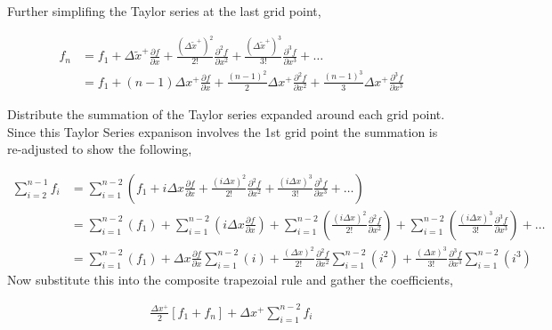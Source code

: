 \documentclass[12pt]{article}
\begin{document}
Further simplifing the Taylor series at the last grid point,

\begin{align*} 
    f_n &= f_1 + 
    \Delta \widetilde{x}^+\frac{\partial f }{\partial x  } +
    \frac{(\Delta \widetilde{x}^+)^2}{2!}\frac{\partial^2 f }{\partial x^2  } +
    \frac{(\Delta \widetilde{x}^+)^3}{3!}\frac{\partial^3 f }{\partial x^3  } + \dots \\
        &= 
        f_1 +
        \left( n - 1 \right)\Delta x^+ 
        \frac{\partial f}{\partial x} +
        \frac{\left( n - 1 \right)^2}{2}\Delta x^+ 
        \frac{\partial^2 f}{\partial x^2} +
        \frac{\left( n - 1 \right)^3}{3}\Delta x^+ 
        \frac{\partial^3 f}{\partial x^3}
\end{align*}

Distribute the summation of the Taylor series expanded around each grid point.
Since this Taylor Series expanison involves the 1st grid point the summation 
is re-adjusted to show the following, 

\begin{align*}
    \sum_{i = 2}^{n - 1} f_i  &= 
    \sum_{i = 1}^{n - 2} \left( 
    f_1 +
    i\Delta x \frac{\partial f }{\partial x } +
    \frac{(i\Delta x)^2}{2!} \frac{\partial^2 f }{\partial x^2 } +
    \frac{(i\Delta x)^3}{3!} \frac{\partial^3 f }{\partial x^3 } + \dots
    \right) \\
                              &=
    \sum_{i = 1}^{n - 2} \left( 
    f_1 \right) +
    \sum_{i = 1}^{n - 2} \left( 
    i\Delta x \frac{\partial f }{\partial x }\right) +
    \sum_{i = 1}^{n - 2} \left( 
    \frac{(i\Delta x)^2}{2!} \frac{\partial^2 f }{\partial x^2 } \right)+
    \sum_{i = 1}^{n - 2} \left( 
    \frac{(i\Delta x)^3}{3!} \frac{\partial^3 f }{\partial x^3 } \right)+ \dots\\ 
                              &=
    \sum_{i = 1}^{n - 2} \left( 
    f_1 \right) +
 \Delta x \frac{\partial f }{\partial x }   
     \sum_{i = 1}^{n - 2} \left( i\right) +
    \frac{(\Delta x)^2}{2!} \frac{\partial^2 f }{\partial x^2 } 
    \sum_{i = 1}^{n - 2} \left( i^2 \right)
    +
    \frac{(\Delta x)^3}{3!} \frac{\partial^3 f }{\partial x^3 } 
    \sum_{i = 1}^{n - 2} \left( i^3 \right)
\end{align*} 
Now substitute this into the composite trapezoial rule and gather the coefficients, 

\begin{align*}
    \frac{\Delta x^+ }{2}\left[ f_1 + f_n \right] + \Delta x^+ \sum_{i=1}^{n-2} f_i 
\end{align*}
\end{document}
